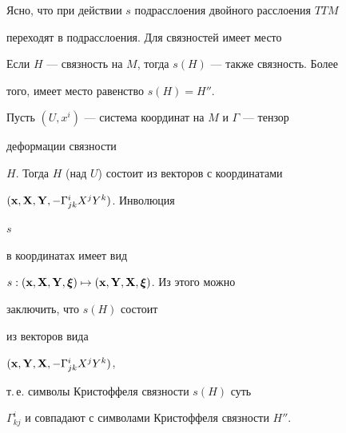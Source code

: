 Ясно, что при действии $s$ подрасслоения двойного расслоения $TTM$ 


переходят в подрасслоения. Для связностей имеет место





\begin{thms}


Если $H$ --- связность на $M$, тогда $s(H)$ --- также связность. Более 


того, имеет место равенство $s(H)=H''$.


\end{thms}





\begin{pf}


Пусть $(U,x^i)$ --- система координат на $M$ и $\Gamma$ --- тензор 


деформации связности 


$H$. Тогда $H$ (над $U$) состоит из векторов с координатами


$(\bold x,\bold X,\bold Y,-\Gamma^i_{jk}X^j Y^k)$. Инволюция 


$s$ 


в координатах имеет вид


$s:(\bold x,\bold X,\bold Y,\boldsymbol\xi)\mapsto


(\bold x,\bold Y,\bold X,\boldsymbol\xi)$. Из этого можно 


заключить, что $s(H)$ состоит 


из векторов вида


$(\bold x,\bold Y,\bold X,-\Gamma^i_{jk}X^j Y^k)$,


т.\,е. символы Кристоффеля связности $s(H)$ суть 


$\Gamma^i_{kj}$ и совпадают с символами Кристоффеля связности $H''$.


\end{pf}





